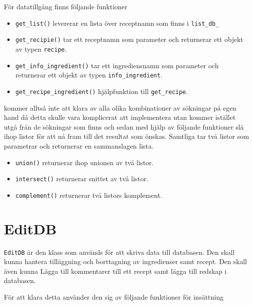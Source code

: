 För datatillgång finns följande funktioner

\begin{itemize}
\item   \verb+get_list()+ levererar en lista över receptnamn som finns i \verb+list_db_+
\item   \verb+get_recipie()+ tar ett receptnamn som parameter och returnerar ett objekt av typen \verb+recipe+.
\item   \verb+get_info_ingredient()+ tar ett ingrediensnamn som parameter och returnerar ett objekt av typen \verb+info_ingredient+.
\item   \verb+get_recipe_ingredient()+ hjälpfunktion till \verb+get_recipe+.
\end{itemize}

\Lookup kommer alltså inte att klara av alla olika kombinationer av sökningar på egen hand då detta skulle vara komplicerat att implementera utan kommer istället utgå från de sökningar som finns och sedan med hjälp av följande funktioner slå ihop listor för att nå fram till det resultat som önskas. Samtliga tar två listor som parametrar och returnerar en sammanslagen lista.

\begin{itemize}
\item   \verb+union()+ returnerar ihop unionen av två listor.
\item   \verb+intersect()+ returnerar snittet av två listor.
\item   \verb+complement()+ returnerar två listors komplement.
\end{itemize}


\section{EditDB}

\verb+EditDB+ är den klass som används för att skriva data till databasen. Den
skall kunna hantera tilläggning och borttagning av ingredienser samt recept. Den
skall även kunna Lägga till kommentarer till ett recept samt lägga till redskap
i databasen.

För att klara detta använder den sig av följande funktioner för insättning

